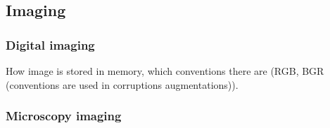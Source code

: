    \subsection{Imaging}
        \subsubsection{Digital imaging}
            
            How image is stored in memory, which conventions there are (RGB, BGR (conventions are used in corruptions augmentations)).
        \subsubsection{Microscopy imaging}
            